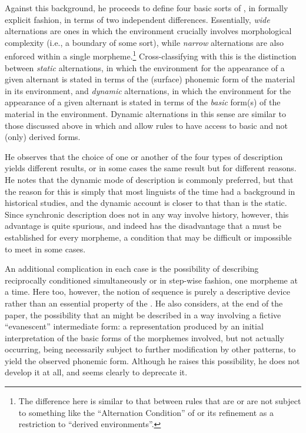 Against this background, he proceeds to define four basic sorts of
, in formally explicit fashion, in terms of two
independent differences. Essentially, \emph{wide} alternations are
ones in which the environment crucially involves morphological
complexity (i.e., a boundary of some sort), while \emph{narrow}
alternations are also enforced within a single morpheme.\footnote{The
  difference here is similar to that between rules that are or are not
  subject to something like the ``Alternation Condition'' of
  \citealt{kiparsky:3dimensions} or its refinement as a restriction to
  ``derived environments''.} Cross-classifying with this is the
distinction between \emph{static} alternations, in which the
environment for the appearance of a given alternant is stated in terms
of the (surface) phonemic form of the material in its environment, and
\emph{dynamic} alternations, in which the environment for the
appearance of a given alternant is stated in terms of the \emph{basic}
form(s) of the material in the environment. Dynamic alternations in
this sense are similar to those discussed above in which {\Sapir} and
{\Harris} allow rules to have access to basic and not (only) derived
forms.

He observes that the choice of one or another of the four types of
description yields different results, or in some cases the same result
but for different reasons. He notes that the dynamic mode of
description is commonly preferred, but that the reason for this is
simply that most linguists of the time had a background in historical
studies, and the dynamic account is closer to that than is the
static. Since synchronic description does not in any way involve
history, however, this advantage is quite spurious, and indeed has the
disadvantage that a  must be established for every morpheme,
a condition that may be difficult or impossible to meet in some cases.

An additional complication in each case is the possibility of
describing reciprocally conditioned  simultaneously or in
step-wise fashion, one morpheme at a time. Here too, however, the
notion of sequence is purely a descriptive device rather than an
essential property of the . He also considers, at the end
of the paper, the possibility that an  might be described
in a way involving a fictive ``evanescent'' intermediate form: a
representation produced by an initial interpretation of the basic
forms of the morphemes involved, but not actually occurring, being
necessarily subject to further modification by other patterns, to
yield the observed phonemic form. Although he raises this
possibility, he does not develop it at all, and seems clearly to
deprecate it.

